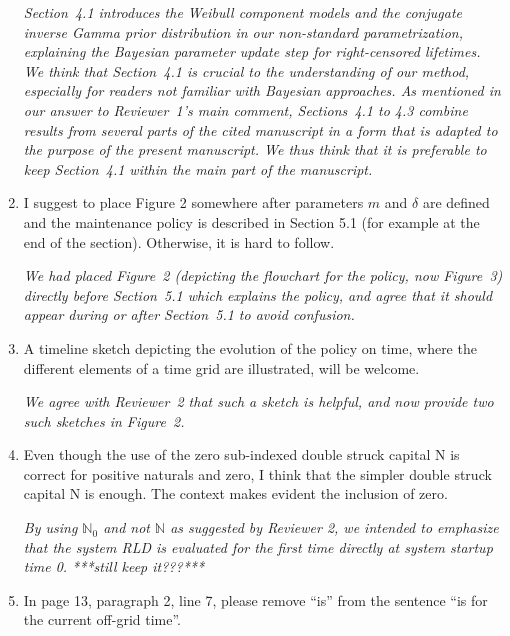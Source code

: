 \documentclass[authoryear]{elsarticle}
\newcommand{\naturals}{\mathbb{N}}
\begin{document}
\begin{enumerate}
\smallskip

\emph{Section~4.1 introduces the Weibull component models
and the conjugate inverse Gamma prior distribution in our non-standard parametrization,
explaining the Bayesian parameter update step for right-censored lifetimes.
We think that Section~4.1 is crucial to the understanding of our method,
especially for readers not familiar with Bayesian approaches.
As mentioned in our answer to Reviewer~1's main comment,
Sections~4.1 to 4.3 combine results from several parts of the cited manuscript
in a form that is adapted to the purpose of the present manuscript.
We thus think that it is preferable to keep Section~4.1 within the main part of the manuscript.}

\item I suggest to place Figure 2 somewhere after parameters $m$ and $\delta$ are defined and the maintenance policy is described in Section 5.1 (for example at the end of the section). Otherwise, it is hard to follow.

\smallskip

\emph{We had placed Figure~2 (depicting the flowchart for the policy, now Figure~3) directly before Section~5.1 which explains the policy,
and agree that it should appear during or after Section~5.1 to avoid confusion.}

\item A timeline sketch depicting the evolution of the policy on time, where the different elements of a time grid are illustrated, will be welcome.

\smallskip

\emph{We agree with Reviewer~2 that such a sketch is helpful, and now provide two such sketches in Figure~2.}

\item Even though the use of the zero sub-indexed double struck capital N is correct for positive naturals and zero, I think that the simpler double struck capital N is enough. The context makes evident the inclusion of zero.

\smallskip

\emph{By using $\naturals_0$ and not $\naturals$ as suggested by Reviewer 2,
we intended to emphasize that the system RLD is evaluated for the first time directly at system startup time 0.
***still keep it???***}

\item In page 13, paragraph 2, line 7, please remove “is” from the sentence “is for the current off-grid time”.


\end{enumerate}
\end{document}
